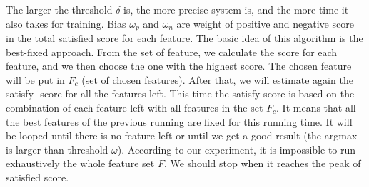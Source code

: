 The larger the threshold $\delta$ is, the more precise system is, and the
more time it also takes for training. Bias $\omega_{p}$ and $\omega_{n}$ are weight of positive
and negative score in the total satisfied score for each feature. The
basic idea of this algorithm is the best-fixed approach. From the set of
feature, we calculate the score for each feature, and we then choose
the one with the highest score. The chosen feature will be put in $F_c$ (set
of chosen features). After that, we will estimate again the satisfy-
score for all the features left. This time the satisfy-score is based on
the combination of each feature left with all features in the set $F_c$. It means
that all the best features of the previous running are fixed for this
running time. It will be looped until there is no feature left or
until we get a good result (the argmax is larger than threshold $\omega$).
According to our experiment, it is impossible to run exhaustively the whole feature set $F$.
We should stop when it reaches the peak of satisfied score.


















